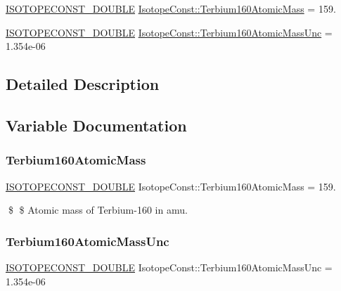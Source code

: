 \begin{DoxyCompactItemize}
\item 
\mbox{\hyperlink{group___isotope_const-_macros_ga8f45a7272ce02c0b4c65c44636ed719a}{I\+S\+O\+T\+O\+P\+E\+C\+O\+N\+S\+T\+\_\+\+D\+O\+U\+B\+LE}} \mbox{\hyperlink{group___isotope_const-_terbium-_tb160_ga3db16c7678d75a4678d5229895ed9138}{Isotope\+Const\+::\+Terbium160\+Atomic\+Mass}} = 159.
\item 
\mbox{\hyperlink{group___isotope_const-_macros_ga8f45a7272ce02c0b4c65c44636ed719a}{I\+S\+O\+T\+O\+P\+E\+C\+O\+N\+S\+T\+\_\+\+D\+O\+U\+B\+LE}} \mbox{\hyperlink{group___isotope_const-_terbium-_tb160_gac9ffa7a87ba23702d747cbf544f8c591}{Isotope\+Const\+::\+Terbium160\+Atomic\+Mass\+Unc}} = 1.\+354e-\/06
\end{DoxyCompactItemize}


\subsection{Detailed Description}


\subsection{Variable Documentation}
\mbox{\label{group___isotope_const-_terbium-_tb160_ga3db16c7678d75a4678d5229895ed9138}} 
\subsubsection{\texorpdfstring{Terbium160\+Atomic\+Mass}{Terbium160AtomicMass}}
{\footnotesize\ttfamily \mbox{\hyperlink{group___isotope_const-_macros_ga8f45a7272ce02c0b4c65c44636ed719a}{I\+S\+O\+T\+O\+P\+E\+C\+O\+N\+S\+T\+\_\+\+D\+O\+U\+B\+LE}} Isotope\+Const\+::\+Terbium160\+Atomic\+Mass = 159.}

\$ \$ Atomic mass of Terbium-\/160 in amu. \mbox{\label{group___isotope_const-_terbium-_tb160_gac9ffa7a87ba23702d747cbf544f8c591}} 
\subsubsection{\texorpdfstring{Terbium160\+Atomic\+Mass\+Unc}{Terbium160AtomicMassUnc}}
{\footnotesize\ttfamily \mbox{\hyperlink{group___isotope_const-_macros_ga8f45a7272ce02c0b4c65c44636ed719a}{I\+S\+O\+T\+O\+P\+E\+C\+O\+N\+S\+T\+\_\+\+D\+O\+U\+B\+LE}} Isotope\+Const\+::\+Terbium160\+Atomic\+Mass\+Unc = 1.\+354e-\/06}

